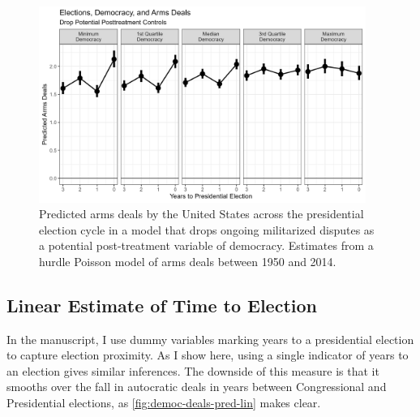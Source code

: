 \documentclass[12pt]{article}
\begin{document}
\begin{figure}[htpb]
	\centering
		\includegraphics[width=0.95\textwidth]{democ-deals-pred-pt.png}
	\caption{Predicted arms deals by the United States across the presidential election cycle in a model that drops ongoing militarized disputes as a potential post-treatment variable of democracy. Estimates from a hurdle Poisson model of arms deals between 1950 and 2014.}
	\label{fig:democ-deals-pred-pt}
\end{figure}


\subsection{Linear Estimate of Time to Election}

In the manuscript, I use dummy variables marking years to a presidential election to capture election proximity. 
As I show here, using a single indicator of years to an election gives similar inferences. 
The downside of this measure is that it smooths over the fall in autocratic deals in years between Congressional and Presidential elections, as \autoref{fig:democ-deals-pred-lin} makes clear. 
\end{document}
